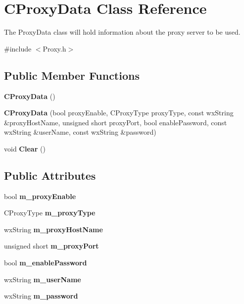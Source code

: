 \section{CProxyData Class Reference}
\label{classCProxyData}


The ProxyData class will hold information about the proxy server to be used.  


{\ttfamily \#include $<$Proxy.h$>$}\subsection*{Public Member Functions}
\begin{DoxyCompactItemize}
\item 
{\bf CProxyData} ()\label{classCProxyData_af68baf69fbde529f8bc97dccda81f3cb}

\item 
{\bf CProxyData} (bool proxyEnable, CProxyType proxyType, const wxString \&proxyHostName, unsigned short proxyPort, bool enablePassword, const wxString \&userName, const wxString \&password)
\item 
void {\bf Clear} ()\label{classCProxyData_a87a257656faec7afbbb1c0beb29b3566}

\end{DoxyCompactItemize}
\subsection*{Public Attributes}
\begin{DoxyCompactItemize}
\item 
bool {\bf m\_\-proxyEnable}\label{classCProxyData_a98f403be733907f0747dcfed8658e8ec}

\item 
CProxyType {\bf m\_\-proxyType}\label{classCProxyData_a319af7e3463971207d3e528ce3639288}

\item 
wxString {\bf m\_\-proxyHostName}\label{classCProxyData_a77f11bf8aef5c06298a3329725b62f89}

\item 
unsigned short {\bf m\_\-proxyPort}\label{classCProxyData_adf3a0c857c343c69fec7276ef9bf40c7}

\item 
bool {\bf m\_\-enablePassword}\label{classCProxyData_ad8d2644bc1b6f9ecb55551519dea2cd6}

\item 
wxString {\bf m\_\-userName}\label{classCProxyData_ae33db15612ca168be370b741b1ea6e0c}

\item 
wxString {\bf m\_\-password}\label{classCProxyData_af1b6eac818d96a3ace65cf254f19a437}

\end{DoxyCompactItemize}


